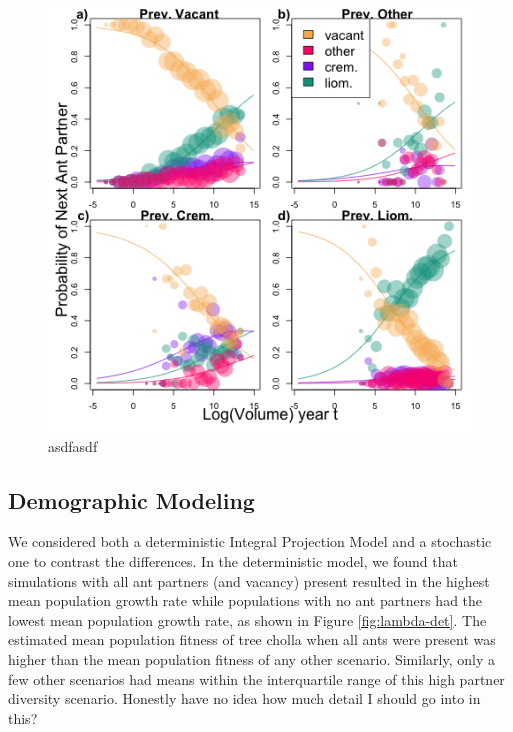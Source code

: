 \documentclass[12pt,a4paper]{article}
\begin{document}
\begin{figure}[h]
	\includegraphics[width=\linewidth]{Ant_Size_Multi.png}
	\caption{asdfasdf}
	\label{fig:ant}
\end{figure}

\subsection*{Demographic Modeling}
We considered both a deterministic Integral Projection Model and a stochastic one to contrast the differences. 
In the deterministic model, we found that simulations with all ant partners (and vacancy) present resulted in the highest mean population growth rate while populations with no ant partners had the lowest mean population growth rate, as shown in Figure \ref{fig:lambda-det}.
The estimated mean population fitness of tree cholla when all ants were present was higher than the mean population fitness of any other scenario.
Similarly, only a few other scenarios had means within the interquartile range of this high partner diversity scenario. 
Honestly have no idea how much detail I should go into in this? 
\end{document}
